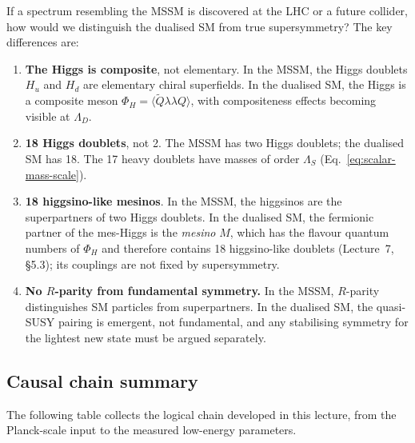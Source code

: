 \documentclass[11pt,a4paper]{article}
\begin{document}
\begin{warningbox}[title={Key discriminator: quasi-SUSY vs.\ true SUSY}]
  If a spectrum resembling the MSSM is discovered at the LHC or a
  future collider, how would we distinguish the dualised SM from true
  supersymmetry?  The key differences are:
  \begin{enumerate}
    \item \textbf{The Higgs is composite}, not elementary.  In the
      MSSM, the Higgs doublets $H_u$ and $H_d$ are elementary chiral
      superfields.  In the dualised SM, the Higgs is a composite meson
      $\Phi_H = \langle \widetilde{Q}\lambda\lambda Q\rangle$, with
      compositeness effects becoming visible at $\Lambda_D$.
    \item \textbf{18 Higgs doublets}, not 2.  The MSSM has two Higgs
      doublets; the dualised SM has 18.  The 17 heavy doublets have
      masses of order $\Lambda_S$ (Eq.~\eqref{eq:scalar-mass-scale}).
    \item \textbf{18 higgsino-like mesinos}.  In the MSSM, the
      higgsinos are the superpartners of two Higgs doublets.  In the
      dualised SM, the fermionic partner of the mes-Higgs is the
      \emph{mesino} $M$, which has the flavour quantum numbers of
      $\Phi_H$ and therefore contains 18 higgsino-like doublets
      (Lecture~7, \S5.3); its couplings are not fixed by
      supersymmetry.
    \item \textbf{No $R$-parity from fundamental symmetry.}  In the
      MSSM, $R$-parity distinguishes SM particles from superpartners.
      In the dualised SM, the quasi-SUSY pairing is emergent, not
      fundamental, and any stabilising symmetry for the lightest new
      state must be argued separately.
  \end{enumerate}
\end{warningbox}


\subsection{Causal chain summary}

The following table collects the logical chain developed in this lecture,
from the Planck-scale input to the measured low-energy parameters.
\end{document}
